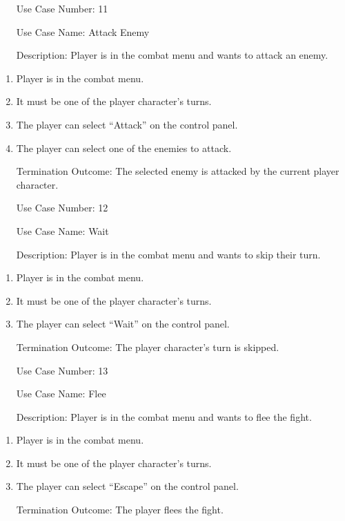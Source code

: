 \documentclass[10pt,conference,onecolumn,compsoc]{IEEEtran}
\begin{document}
\begin{itemize}
\item[Use Case Number:] 11
\item[Use Case Name:] Attack Enemy
\item[Description:] Player is in the combat menu and wants to attack an enemy.
\end{itemize}
\begin{enumerate}
\item Player is in the combat menu.
\item It must be one of the player character's turns.
\item The player can select “Attack” on the control panel.
\item The player can select one of the enemies to attack.
\item [Termination Outcome:] The selected enemy is attacked by the current player character.
\end{enumerate}

\begin{itemize}
\item[Use Case Number:] 12
\item[Use Case Name:] Wait
\item[Description:] Player is in the combat menu and wants to skip their turn.
\end{itemize}
\begin{enumerate}
\item Player is in the combat menu.
\item It must be one of the player character's turns.
\item The player can select “Wait” on the control panel.
\item [Termination Outcome:] The player character's turn is skipped.
\end{enumerate}

\begin{itemize}
\item[Use Case Number:] 13
\item[Use Case Name:] Flee
\item[Description:] Player is in the combat menu and wants to flee the fight.
\end{itemize}
\begin{enumerate}
\item Player is in the combat menu.
\item It must be one of the player character's turns.
\item The player can select “Escape” on the control panel.
\item [Termination Outcome:] The player flees the fight.
\end{enumerate}
\end{document}
